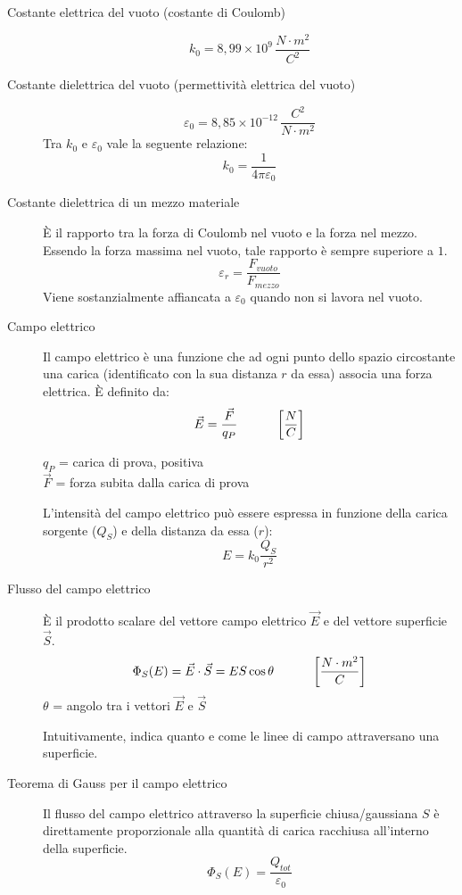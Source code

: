 \documentclass[a4paper,11pt,italian]{article}
\begin{document}
\begin{description}
  \item[Costante elettrica del vuoto (costante di Coulomb)] 
  \[ k_0 = 8,99 \times 10^9 \, \frac{N\cdot m^2}{C^2} \]
  
  \item[Costante dielettrica del vuoto (permettività elettrica del vuoto)]
  \[ \varepsilon_0 = 8,85\times 10^{-12} \, \frac{C^2}{N \cdot m^2} \]
  Tra $ k_0 $ e $ \varepsilon_0 $ vale la seguente relazione:
  \[ k_0 = \frac{1}{4 \pi \varepsilon_0} \]
  
  \item[Costante dielettrica di un mezzo materiale] 
  È il rapporto tra la forza di Coulomb nel vuoto e la forza nel mezzo. Essendo la forza massima nel vuoto, tale rapporto è sempre superiore a $ 1 $.
  \[ \varepsilon_r = \frac{F_{vuoto}}{F_{mezzo}} \]
  Viene sostanzialmente affiancata a $ \varepsilon_0 $ quando non si lavora nel vuoto.

  \item[Campo elettrico] 
  Il campo elettrico è una funzione che ad ogni punto dello spazio circostante una carica (identificato con la sua distanza $ r $ da essa) associa una forza elettrica. 
  È definito da:
  \[ \vec{E}  = \frac{\vec{F}}{q_P} \hspace*{3em} \left[ \frac{N}{C} \right] \]
  \begin{multicols}{2}
  $ q_P $ = carica di prova, positiva\\
  $ \vec{F}  $ = forza subita dalla carica di prova
  \end{multicols}
  
  L'intensità del campo elettrico può essere espressa in funzione della carica sorgente ($ Q_S $) e della distanza da essa ($ r $):
  \[ E = k_0 \frac{Q_S}{r^2}  \]
    
  \item[Flusso del campo elettrico] 
  È il prodotto scalare del vettore campo elettrico $ \vec{E} $ e del vettore superficie $ \vec{S} $.
  \[ \Phi_S(E) = \vec{E} \cdot \vec{S} = ES \cos \theta \hspace*{3em} \left[ \frac{N\cdot m^2}{C} \right] \]
  $ \theta $ = angolo tra i vettori $ \vec{E} $ e $ \vec{S} $
  
  Intuitivamente, indica quanto e come le linee di campo attraversano una superficie.
    
  \item[Teorema di Gauss per il campo elettrico] 
  Il flusso del campo elettrico attraverso la superficie chiusa/gaussiana $ S $ è direttamente proporzionale alla quantità di carica racchiusa all'interno della superficie.
  \[ \Phi_S(E) = \frac{Q_{tot}}{\varepsilon_0} \]
  

\end{description}
\end{document}

